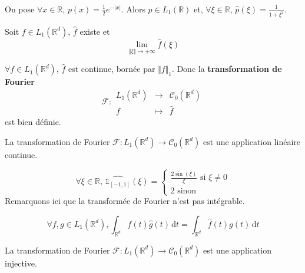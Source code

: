	\begin{example}
		On pose $\forall x \in \mathbb{R}$, $p(x) = \frac{1}{2} e^{-|x|}$. Alors $p \in L_1(\mathbb{R})$ et, $\forall \xi \in \mathbb{R}$, $\widehat{p}(\xi) = \frac{1}{1+\xi^2}$.
	\end{example}
	
	\begin{lemma}
		Soit $f \in L_1(\mathbb{R}^d)$, $\widehat{f}$ existe et
		\[ \lim_{\Vert \xi \Vert \rightarrow +\infty} \widehat{f}(\xi) \]
	\end{lemma}

	\begin{theorem}
		$\forall f \in L_1(\mathbb{R}^d)$, $\widehat{f}$ est continue, bornée par $\Vert f \Vert_1$. Donc la \textbf{transformation de Fourier}
		\[
		\mathcal{F} :
		\begin{array}{ccc}
			L_1(\mathbb{R}^d) &\rightarrow& \mathcal{C}_0(\mathbb{R}^d) \\
			f &\mapsto& \widehat{f}
		\end{array}
		\]
		est bien définie.
	\end{theorem}
	
	\begin{corollary}
		La transformation de Fourier $\mathcal{F} : L_1(\mathbb{R}^d) \rightarrow \mathcal{C}_0(\mathbb{R}^d)$ est une application linéaire continue.
	\end{corollary}
	
	\begin{example}
		\[
		\forall \xi \in \mathbb{R}, \, \widehat{\mathbb{1}_{[-1,1]}}(\xi) =
		\begin{cases}
			\frac{2 \sin(\xi)}{\xi} \text{ si } \xi \neq 0 \\
			2 \text{ sinon}
		\end{cases}
		\]
		Remarquons ici que la transformée de Fourier n'est pas intégrable.
	\end{example}
	
	\begin{theorem}
		\[ \forall f, g \in L_1(\mathbb{R}^d), \int_{\mathbb{R}^d} f(t) \widehat{g}(t) \, \mathrm{d}t = \int_{\mathbb{R}^d} \widehat{f}(t) g(t) \, \mathrm{d}t \]
	\end{theorem}
	
	\begin{corollary}
		La transformation de Fourier $\mathcal{F} : L_1(\mathbb{R}^d) \rightarrow \mathcal{C}_0(\mathbb{R}^d)$ est une application injective.
	\end{corollary}
	

